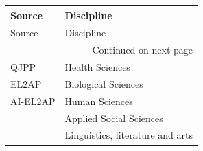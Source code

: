 \begin{longtable}{ll}
\toprule
Source & Discipline \\
\midrule
\endfirsthead
\toprule
Source & Discipline \\
\midrule
\endhead
\midrule
\multicolumn{2}{r}{Continued on next page} \\
\midrule
\endfoot
\bottomrule
\endlastfoot
QJPP & Health Sciences \\
EL2AP & Biological Sciences \\
AI-EL2AP & Human Sciences \\
 & Applied Social Sciences \\
 & Linguistics, literature and arts \\
\end{longtable}
